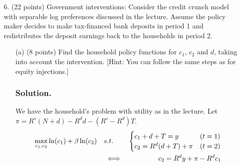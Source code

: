 \documentclass[12pt]{article}
\begin{document}
\begin{enumerate}
\begin{enumerate}
    \end{enumerate}

\item[6.] (22 points) Government interventions: Consider the credit crunch model with separable log preferences discussed in the lecture. Assume the policy maker decides to make tax-financed bank
    deposits in period 1 and redistributes the deposit earnings back to the households in period 2.
    \begin{enumerate}
        \item[(a)] {(8 points)} Find the household policy functions for $c_1$, $c_2$ and $d$, taking into account the intervention. [Hint: You can follow the same steps as for equity injections.]
        \subsubsection*{Solution.}

        
    We have the household's problem with utility as in the lecture. Let $\pi = R^s(N+d) - R^dd - (R^s-R^d)T.$
    \begin{align}
            &\max_{c_1, c_2}  \ln(c_1) + \beta \ln(c_2)
            && s.t. &\begin{cases}
                c_1 + d + T =y & (t=1)
                \\ c_2 = R^d(d+T) + \pi  & (t=2)
            \end{cases} \label{3ch}
            \\ &&& \iff & c_2 = R^dy + \pi - R^d c_1 \notag  %
    \end{align}
    

\end{enumerate}
\end{enumerate}
\end{document}
